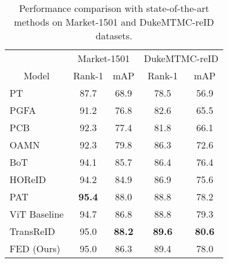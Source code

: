 \documentclass[10pt,twocolumn,letterpaper]{article}
\begin{document}
\begin{table}[t]
	\centering
	\small
	\begin{tabular}{ccccc}
	    \toprule
		\multicolumn{1}{c}{} & \multicolumn{2}{c}{Market-1501} & \multicolumn{2}{c}{DukeMTMC-reID} \\
		\multicolumn{1}{c}{Model} & Rank-1 & mAP & Rank-1 &  mAP \\
		\hline
		\multicolumn{1}{l}{PT \cite{liu2018poset}} & 87.7 & 68.9 & 78.5 & 56.9 \\
		\multicolumn{1}{l}{PGFA \cite{miao2019pose}} & 91.2 & 76.8 & 82.6 & 65.5 \\
		\multicolumn{1}{l}{PCB \cite{sun2018beyond}} & 92.3 & 77.4 & 81.8 & 66.1 \\
		\multicolumn{1}{l}{OAMN \cite{chen2021occlude}} & 92.3 & 79.8 & 86.3 & 72.6 \\
		\multicolumn{1}{l}{BoT \cite{luo2019bag}} & 94.1 & 85.7 & 86.4 & 76.4 \\

		\multicolumn{1}{l}{HOReID \cite{wang2020high}} & 94.2 & 84.9 & 86.9 & 75.6 \\
		\multicolumn{1}{l}{PAT \cite{li2021diverse}} & \textbf{95.4} & 88.0 & 88.8 & 78.2 \\
		\hline
		\multicolumn{1}{l}{ViT Baseline \cite{he2021transreid}} & 94.7 & 86.8 & 88.8 & 79.3 \\
		\multicolumn{1}{l}{TransReID \cite{he2021transreid}} & 95.0 & \textbf{88.2} & \textbf{89.6} & \textbf{80.6}\\
		\hline
		\multicolumn{1}{l}{FED (Ours)} & 95.0 & 86.3 & 89.4 & 78.0\\
		\bottomrule
	\end{tabular}
	\caption{Performance comparison with state-of-the-art methods on Market-1501 and DukeMTMC-reID datasets.
	}
	\label{holistic}
\end{table}
\end{document}
